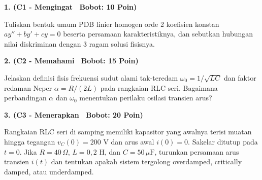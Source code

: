 \documentclass[10pt,a4paper]{article}
\begin{document}
\noindent\textbf{1. (C1 - Mengingat \textbar\ Bobot: 10 Poin)}\par\vspace{0.8mm}
{\footnotesize Tuliskan bentuk umum PDB linier homogen orde 2 koefisien konstan $a y'' + b y' + c y = 0$ beserta persamaan karakteristiknya, dan sebutkan hubungan nilai diskriminan dengan 3 ragam solusi fisisnya.}\par

\vspace{2.5mm}

\noindent\textbf{2. (C2 - Memahami \textbar\ Bobot: 15 Poin)}\par\vspace{0.8mm}
{\footnotesize Jelaskan definisi fisis frekuensi sudut alami tak-teredam $\omega_0 = 1/\sqrt{LC}$ dan faktor redaman Neper $\alpha = R/(2L)$ pada rangkaian RLC seri. Bagaimana perbandingan $\alpha$ dan $\omega_0$ menentukan perilaku osilasi transien arus?}\par

\vspace{2.5mm}

\noindent\textbf{3. (C3 - Menerapkan \textbar\ Bobot: 20 Poin)}\par\vspace{0.8mm}
\noindent\begin{minipage}[t]{0.60\textwidth}%
  {\footnotesize Rangkaian RLC seri di samping memiliki kapasitor yang awalnya terisi muatan hingga tegangan $v_C(0) = 200\text{ V}$ dan arus awal $i(0) = 0$. Sakelar ditutup pada $t=0$. Jika $R = 40\,\Omega$, $L = 0{,}2\text{ H}$, dan $C = 50\,\mu\text{F}$, turunkan persamaan arus transien $i(t)$ dan tentukan apakah sistem tergolong overdamped, critically damped, atau underdamped.}%
\end{minipage}%
\hfill%
\begin{minipage}[t]{0.37\textwidth}%
  \centering
\end{minipage}\par
\end{document}
